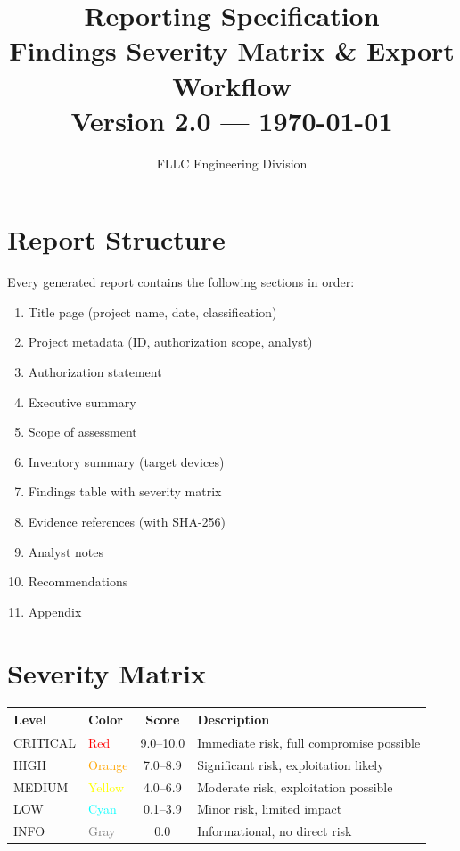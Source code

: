\documentclass[11pt,a4paper]{article}
\title{%
  {\Huge\bfseries\textcolor{cyber}{Reporting Specification}}\\[6pt]
  {\Large Findings Severity Matrix \& Export Workflow}\\[4pt]
  {\normalsize Version 2.0 --- \today}
}
\author{FLLC Engineering Division}
\date{}
\begin{document}
\maketitle\thispagestyle{fancy}
\tableofcontents\newpage

\section{Report Structure}
Every generated report contains the following sections in order:
\begin{enumerate}
  \item Title page (project name, date, classification)
  \item Project metadata (ID, authorization scope, analyst)
  \item Authorization statement
  \item Executive summary
  \item Scope of assessment
  \item Inventory summary (target devices)
  \item Findings table with severity matrix
  \item Evidence references (with SHA-256)
  \item Analyst notes
  \item Recommendations
  \item Appendix
\end{enumerate}

\section{Severity Matrix}
\begin{tabular}{llcp{7cm}}
\toprule
\textbf{Level} & \textbf{Color} & \textbf{Score} & \textbf{Description} \\
\midrule
CRITICAL & \textcolor{red}{Red}       & 9.0--10.0 & Immediate risk, full compromise possible \\
HIGH     & \textcolor{orange}{Orange} & 7.0--8.9  & Significant risk, exploitation likely \\
MEDIUM   & \textcolor{yellow}{Yellow} & 4.0--6.9  & Moderate risk, exploitation possible \\
LOW      & \textcolor{cyan}{Cyan}     & 0.1--3.9  & Minor risk, limited impact \\
INFO     & \textcolor{gray}{Gray}     & 0.0       & Informational, no direct risk \\
\bottomrule
\end{tabular}
\end{document}
